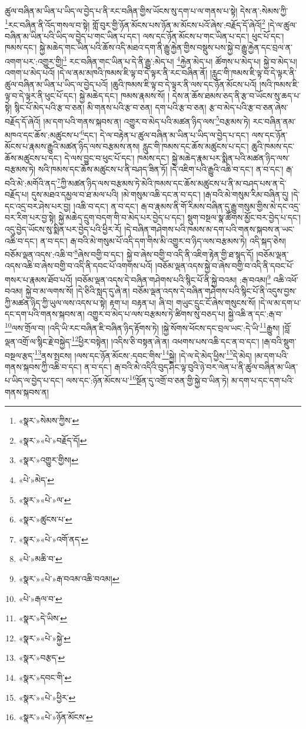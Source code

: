 ཚུལ་བཞིན་མ་ཡིན་པ་ཡིད་ལ་བྱེད་པ་ནི་རང་བཞིན་གྱིས་ཡོངས་སུ་དག་པ་ལ་གནས་པ་སྟེ། དེས་ན་:སེམས་ཀྱི་\footnote{«སྣར་»སེམས་ཀྱིས་}རང་བཞིན་ནི་འོད་གསལ་བ་སྟེ། གློ་བུར་གྱི་ཉོན་མོངས་པས་ཉོན་མ་མོངས་པའོ་ཞེས་:བརྗོད་དོ་ཞེའོ།\footnote{«སྣར་»«པེ་»བརྗོད་དོ།} །དེ་ལ་ཚུལ་བཞིན་མ་ཡིན་པའི་ཡིད་ལ་བྱེད་པ་གང་ཡིན་པ་དང་། ལས་དང་ཉོན་མོངས་པ་གང་ཡིན་པ་དང་། ཕུང་པོ་དང་། ཁམས་དང་། སྐྱེ་མཆེད་གང་ཡིན་པའི་ཆོས་འདི་མཐའ་དག་ནི་རྒྱུ་རྐྱེན་གྱིས་བསྡུས་པས་སྐྱེ་བ་རྒྱུ་རྐྱེན་དང་བྲལ་ན་འགག་པར་:འགྱུར་གྱི།\footnote{«སྣར་»འགྱུར་གྱིས།} རང་བཞིན་གང་ཡིན་པ་དེ་ནི་རྒྱུ་:མེད་པ། \footnote{«པེ་»མེད་}རྐྱེན་མེད་པ། ཚོགས་པ་མེད་པ། སྐྱེ་བ་མེད་པ། འགག་པ་མེད་པའོ། །དེ་ལ་ནམ་མཁའི་ཁམས་ཇི་ལྟ་བ་དེ་ལྟར་ནི་རང་བཞིན་ནོ། །རླུང་གི་ཁམས་ཇི་ལྟ་བ་དེ་ལྟར་ནི་ཚུལ་བཞིན་མ་ཡིན་པ་ཡིད་ལ་བྱེད་པའོ། །ཆུའི་ཁམས་ཇི་ལྟ་བ་དེ་ལྟར་ནི་ལས་དང་ཉོན་མོངས་པའོ། །སའི་ཁམས་ཇི་ལྟ་བ་དེ་ལྟར་ནི་ཕུང་པོ་དང་། སྐྱེ་མཆེད་དང་། ཁམས་རྣམས་སོ། །
དེས་ན་ཆོས་ཐམས་ཅད་ནི་རྩ་བ་ཡོངས་སུ་ཆད་པ་སྟེ། སྙིང་པོ་མེད་པའི་རྩ་བ་ཅན། མི་གནས་པའི་རྩ་བ་ཅན། དག་པའི་རྩ་བ་ཅན། རྩ་བ་མེད་པའི་རྩ་བ་ཅན་ཞེས་བརྗོད་དོ་ཞེའོ། །མ་དག་པའི་གནས་སྐབས་ན། འགྱུར་བ་མེད་པའི་མཚན་ཉིད་ལས་\footnote{«སྣར་»«པེ་»ལ་}བརྩམས་ཏེ། རང་བཞིན་ནམ་མཁའ་དང་ཆོས་:མཚུངས་པ་\footnote{«སྣར་»ཚུངས་པ་}དང་། དེ་ལ་བརྟེན་པ་ཚུལ་བཞིན་མ་ཡིན་པ་ཡིད་ལ་བྱེད་པ་དང་། ལས་དང་ཉོན་མོངས་པ་རྣམས་རྒྱུའི་མཚན་ཉིད་ལས་བརྩམས་ནས། རླུང་གི་ཁམས་དང་ཆོས་མཚུངས་པ་དང་། ཆུའི་ཁམས་དང་ཆོས་མཚུངས་པ་དང་། དེ་ལས་བྱུང་བ་ཕུང་པོ་དང་། ཁམས་དང་། སྐྱེ་མཆེད་རྣམ་པར་སྨིན་པའི་མཚན་ཉིད་ལས་བརྩམས་ཏེ། སའི་ཁམས་དང་ཆོས་མཚུངས་པ་ནི་བཤད་ཟིན་ཏོ། །དེ་འཇིག་པའི་རྒྱུའི་འཆི་བ་དང་། ན་བ་དང་། རྒ་བའི་མེ་:མགོའི་ནད་\footnote{«སྣར་»«པེ་»འགོ་ནད་}ཀྱི་མཚན་ཉིད་ལས་བརྩམས་ཏེ་མེའི་ཁམས་དང་ཆོས་མཚུངས་པ་ནི་མ་བཤད་པས་ན་དེ་བརྗོད་པ། དུས་མཐའ་དམྱལ་བ་ཐ་མལ་པའི། །མེ་གསུམ་འཆི་དང་ན་བ་དང་། །རྒ་བའི་མེ་གསུམ་རིམ་བཞིན་དུ། །དེ་དང་འདྲ་བར་ཤེས་པར་བྱ། །འཆི་བ་དང་། ན་བ་དང་། རྒ་བ་རྣམས་ནི་གོ་རིམས་བཞིན་དུ་རྒྱུ་གསུམ་གྱིས་མེ་དང་འདྲ་བར་རིག་པར་བྱ་སྟེ། སྐྱེ་མཆེད་དྲུག་བདག་གི་བ་མེད་པར་བྱེད་པ་དང་། སྡུག་བསྔལ་སྣ་ཚོགས་མྱོང་བར་བྱེད་པ་དང་། འདུ་བྱེད་ཡོངས་སུ་སྨིན་པར་བྱེད་པའི་ཕྱིར་རོ། །དེ་བཞིན་གཤེགས་པའི་ཁམས་མ་དག་པའི་གནས་སྐབས་ན་ཡང་འཆི་བ་དང་། ན་བ་དང་། རྒ་བའི་མེ་གསུམ་པོ་འདི་དག་གིས་མི་འགྱུར་བ་ཉིད་ལས་བརྩམས་ཏེ། འདི་སྐད་ཅེས། བཅོམ་ལྡན་འདས་:འཆི་བ་\footnote{«པེ་»མཆི་བ་}ཞེས་བགྱི་བ་དང་། སྐྱེ་བ་ཞེས་བགྱི་བ་འདི་ནི་འཇིག་རྟེན་གྱི་ཐ་སྙད་དོ། །བཅོམ་ལྡན་འདས་འཆི་བ་ཞེས་བགྱི་བ་འདི་ནི་དབང་པོ་འགགས་པའོ། །བཅོམ་ལྡན་འདས་སྐྱེ་བ་ཞེས་བགྱི་བ་འདི་ནི་དབང་པོ་གསར་པ་རྣམས་ཐོབ་པའོ། །བཅོམ་ལྡན་འདས་དེ་བཞིན་གཤེགས་པའི་སྙིང་པོ་ནི་སྐྱེ་བའམ། :རྒ་བའམ།\footnote{«སྣར་»«པེ་»རྒ་བའམ་འཆི་བའམ།} འཆི་འཕོ་བའམ། སྐྱེ་བ་མ་ལགས་སོ། །དེ་ཅིའི་སླད་དུ་ཞེ་ན། བཅོམ་ལྡན་འདས་དེ་བཞིན་གཤེགས་པའི་སྙིང་པོ་ནི་འདུས་བྱས་ཀྱི་མཚན་ཉིད་ཀྱི་ཡུལ་ལས་འདས་པ་སྟེ། རྟག་པ། བརྟན་པ། ཞི་བ། གཡུང་དྲུང་ངོ་ཞེས་གསུངས་སོ། །དེ་ལ་མ་དག་པ་དང་དག་པའི་གནས་སྐབས་ན། འགྱུར་བ་མེད་པ་ལས་བརྩམས་ཏེ་ཚིགས་སུ་བཅད་པ། སྐྱེ་འཆི་ན་དང་:རྒ་བ་\footnote{«པེ་»རྒལ་བ་}ལས་གྲོལ་བ། །འདི་ཡི་རང་བཞིན་ཇི་བཞིན་ཉིད་རྟོགས་ཏེ། །སྐྱེ་སོགས་ཕོངས་དང་བྲལ་ཡང་:དེ་ཡི་\footnote{«སྣར་»དེ་ཡིས་}རྒྱུས། །བློ་ལྡན་འགྲོ་ལ་སྙིང་རྗེ་བསྐྱེད་\footnote{«སྣར་»«པེ་»སྐྱེ་}ཕྱིར་བསྟེན། །འདིས་ཅི་བསྟན་ཞེ་ན། འཕགས་པས་འཆི་དང་ན་བ་དང་། །རྒ་བའི་སྡུག་བསྔལ་རྩད་\footnote{«སྣར་»བརྩད་}ནས་སྤངས། །ལས་དང་ཉོན་མོངས་:དབང་གིས་\footnote{«སྣར་»དབང་གི་}སྐྱེ། །དེ་ལ་དེ་མེད་ཕྱིས་\footnote{«སྣར་»«པེ་»ཕྱིར་}དེ་མེད། །མ་དག་པའི་གནས་སྐབས་ཀྱི་འཆི་བ་དང་། ན་བ་དང་། རྒ་བའི་མེ་འདིའི་བུད་ཤིང་ལྟ་བུའི་ཉེ་བར་ལེན་པ་ནི་ཚུལ་བཞིན་མ་ཡིན་པ་ཡིད་ལ་བྱེད་པ་དང་། ལས་དང་:ཉོན་མོངས་པ་\footnote{«སྣར་»«པེ་»ཉོན་མོངས་}སྔོན་དུ་འགྲོ་བ་ཅན་གྱི་སྐྱེ་བ་ཡིན་ཏེ། མ་དག་པ་དང་དག་པའི་གནས་སྐབས་ན། 